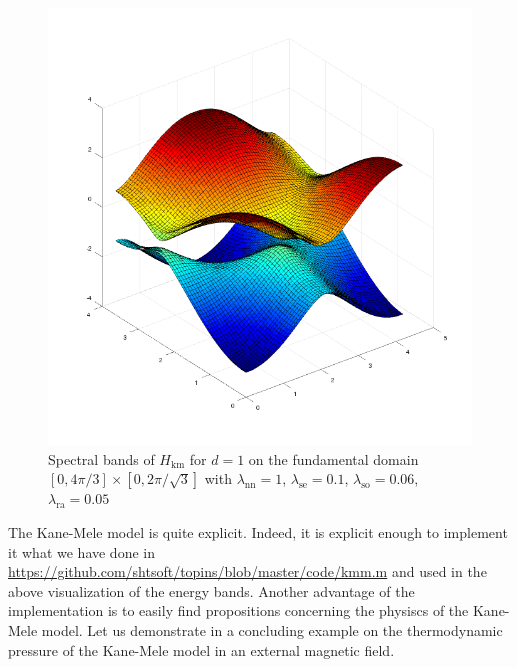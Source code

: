 \begin{enumerate}
\begin{figure}[H]
\includegraphics[scale=0.4]{graphics/specrash.png}
\caption{Spectral bands of $H_{\textrm{km}}$ for $d = 1$ on the fundamental domain $[0,4\pi/3] \times [0,2\pi/\sqrt{3}]$ with $\lambda_{\textrm{nn}} = 1$, $\lambda_{\textrm{se}} = 0.1$, $\lambda_{\textrm{so}} = 0.06$, $\lambda_{\textrm{ra}} = 0.05$}
\label{fig:specrash}
\end{figure}
\end{enumerate}
The Kane-Mele model is quite explicit. Indeed, it is explicit enough to implement it what we have done in \href{https://github.com/shtsoft/topins/blob/master/code/kmm.m}{https://github.com/shtsoft/topins/blob/master/code/kmm.m} and used in the above visualization of the energy bands. Another advantage of the implementation is to easily find propositions concerning the physiscs of the Kane-Mele model. Let us demonstrate in a concluding example on the thermodynamic pressure of the Kane-Mele model in an external magnetic field.
\\
